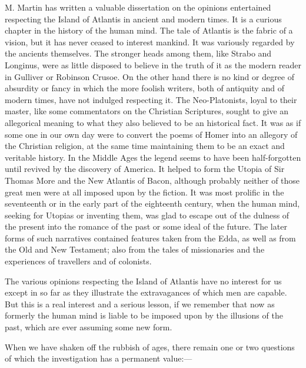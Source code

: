 \documentclass[11pt,letter]{article}
\begin{document}
\par  M. Martin has written a valuable dissertation on the opinions entertained respecting the Island of Atlantis in ancient and modern times. It is a curious chapter in the history of the human mind. The tale of Atlantis is the fabric of a vision, but it has never ceased to interest mankind. It was variously regarded by the ancients themselves. The stronger heads among them, like Strabo and Longinus, were as little disposed to believe in the truth of it as the modern reader in Gulliver or Robinson Crusoe. On the other hand there is no kind or degree of absurdity or fancy in which the more foolish writers, both of antiquity and of modern times, have not indulged respecting it. The Neo-Platonists, loyal to their master, like some commentators on the Christian Scriptures, sought to give an allegorical meaning to what they also believed to be an historical fact. It was as if some one in our own day were to convert the poems of Homer into an allegory of the Christian religion, at the same time maintaining them to be an exact and veritable history. In the Middle Ages the legend seems to have been half-forgotten until revived by the discovery of America. It helped to form the Utopia of Sir Thomas More and the New Atlantis of Bacon, although probably neither of those great men were at all imposed upon by the fiction. It was most prolific in the seventeenth or in the early part of the eighteenth century, when the human mind, seeking for Utopias or inventing them, was glad to escape out of the dulness of the present into the romance of the past or some ideal of the future. The later forms of such narratives contained features taken from the Edda, as well as from the Old and New Testament; also from the tales of missionaries and the experiences of travellers and of colonists.

\par  The various opinions respecting the Island of Atlantis have no interest for us except in so far as they illustrate the extravagances of which men are capable. But this is a real interest and a serious lesson, if we remember that now as formerly the human mind is liable to be imposed upon by the illusions of the past, which are ever assuming some new form.

\par  When we have shaken off the rubbish of ages, there remain one or two questions of which the investigation has a permanent value:—
\end{document}
